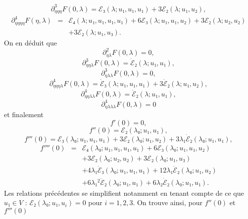 \documentclass[12pt, final]{amsart}
\theoremstyle{definition}
\begin{document}
\begin{equation} \partial_{η η η}^3 F(0, λ) =ℰ₃
 (λ ; u₁, u₁, u₁) + 3ℰ₂(λ ; u₁, u₂), \end{equation}
\begin{eqnarray}
 \partial_{η η η η}^4 F(η,
 λ) & = & ℰ₄(λ ; u₁, u₁, u₁, u₁) + 6ℰ₃
 (λ ; u₁, u₁, u₂) + 3ℰ₂(λ ; u₂, u₂) \nonumber\\
 & & + 3ℰ₂(λ ; u₁, u₃) . \nonumber
\end{eqnarray}
On en déduit que
\begin{equation} \partial_{η λ}^2 F(0, λ) = 0, \end{equation}
\begin{equation} \partial_{η η λ}^3 F(0, λ) =
  \dot{ℰ}₂(λ ; u₁, u₁), \end{equation}
\begin{equation} \partial_{η λ λ}^3 F(0, λ) = 0, \end{equation}
\begin{equation} \partial_{η η η λ}^4 F(0,
  λ) = \dot{ℰ}₃(λ ; u₁, u₁, u₁) + 3
  \dot{ℰ}₂(λ ; u₁, u₂), \text{} \text{} \end{equation}
\begin{equation} \partial_{η η λ λ}^4 F(0,
  λ) = \ddot{ℰ}₂(λ ; u₁, u₁), \end{equation}
\begin{equation} \partial_{η λ λ λ}^4 F(0,
  λ) = 0 \end{equation}
et finalement
\begin{equation} f'(0) = 0, \end{equation}
\begin{equation} f''(0) =ℰ₂(λ₀ ; u₁, u₁), \end{equation}
\begin{equation} f'''(0) =ℰ₃(λ₀ ; u₁, u₁, u₁) + 3ℰ₂
 (λ₀ ; u₁, u₂) + 3 λ₁ \dot{ℰ}₂(λ₀ ; u₁,
  u₁), \end{equation}
\begin{eqnarray}
 f''''(0) & = & ℰ₄(λ₀ ; u₁, u₁, u₁, u₁) +
 6ℰ₃(λ₀ ; u₁, u₁, u₂) \nonumber\\
 & & + 3ℰ₂(λ₀ ; u₂, u₂) + 3ℰ₂
 (λ₀ ; u₁, u₃) \nonumber\\
 & & + 4 λ₁ \dot{ℰ}₃(λ₀ ; u₁, u₁,
 u₁) + 12 λ₁ \dot{ℰ}₂(λ₀ ; u₁, u₂) \nonumber\\
 & & + 6 λ₁^2 \ddot{ℰ}₂(λ₀ ; u₁, u₁)
 + 6 λ₂ \dot{ℰ}₂(λ₀ ; u₁, u₁) . \nonumber
\end{eqnarray}
Les relations précédentes se simplifient notamment en tenant compte de ce que \(u₁∈V\) : \(ℰ₂(λ₀ ; u₁, u_i) = 0\) pour \(i = 1, 2, 3\). On trouve ainsi, pour \(f''(0)\) et \(f'''(0)\)
\end{document}
